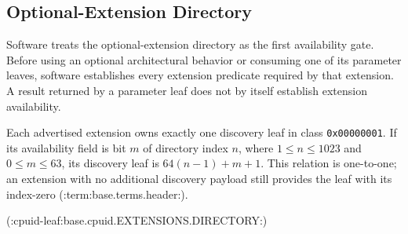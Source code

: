 \subsection{Optional-Extension Directory}\label{section:cpuid-extension-directory}
Software treats the optional-extension directory as the first availability gate. Before using an optional
architectural behavior or consuming one of its parameter leaves, software establishes every extension predicate
required by that extension. A result returned by a parameter leaf does not by itself establish extension
availability.

Each advertised extension owns exactly one discovery leaf in class \texttt{0x00000001}. If its availability
field is bit $m$ of directory index $n$, where $1 \le n \le 1023$ and $0 \le m \le 63$, its discovery
leaf is $64(n-1)+m+1$. This relation is one-to-one; an extension with no additional discovery payload still
provides the leaf with its index-zero (:term:base.terms.header:).

(:cpuid-leaf:base.cpuid.EXTENSIONS.DIRECTORY:)
